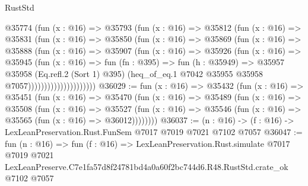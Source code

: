 \begin{lexlean}{RustStd}
\begin{coremodule}
                      @35774
                        (fun (x : @16) =>
                        @35793
                          (fun (x : @16) =>
                          @35812
                            (fun (x : @16) =>
                            @35831
                              (fun (x : @16) =>
                              @35850
                                (fun (x : @16) =>
                                @35869
                                  (fun (x : @16) =>
                                  @35888
                                    (fun (x : @16) =>
                                    @35907
                                      (fun (x : @16) =>
                                      @35926
                                        (fun (x : @16) =>
                                        @35945
                                          (fun (x : @16) =>
                                          fun (fn : @395) =>
                                          fun (h : @35949) =>
                                          @35957
                                            @35958
                                            (Eq.refl.{2} (Sort 1) @395)
                                            (heq_of_eq.{1}
                                              @7042
                                              @35955
                                              @35958
                                              @7057)))))))))))))))))))))
@36029 := fun (x : @16) =>
  @35432
    (fun (x : @16) =>
    @35451
      (fun (x : @16) =>
      @35470
        (fun (x : @16) =>
        @35489
          (fun (x : @16) =>
          @35508
            (fun (x : @16) =>
            @35527
              (fun (x : @16) => @35546 (fun (x : @16) => @35565 (fun (x : @16) => @36012))))))))
@36037 := (n : @16) -> (f : @16) -> LexLeanPreservation.Rust.FunSem @7017 @7019 @7021 @7102 @7057
@36047 := fun (n : @16) =>
  fun (f : @16) =>
  LexLeanPreservation.Rust.simulate
    @7017
    @7019
    @7021
    LexLeanPreserve.C7e1fa57d8f24781bd4a0a60f2bc744d6.R48.RustStd.crate_ok
    @7102
    @7057
\end{coremodule}
\end{lexlean}
